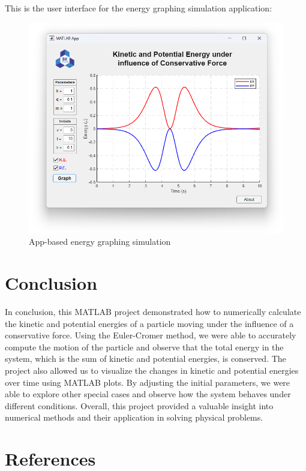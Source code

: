 \documentclass[13pt,a4paper]{report}
\begin{document}
\vspace{0.25cm}

This is the user interface for the energy graphing simulation application:

\vspace{-0.25cm}
\begin{figure}[!ht]
  \centering
  \includegraphics[scale=0.6]{result.png}
  \vspace{-0.75cm}
  \caption{App-based energy graphing simulation}
  \label{fig:result}
\end{figure}

\section{Conclusion}
In conclusion, this MATLAB project demonstrated how to numerically calculate the kinetic and potential energies of a particle moving under the influence of a conservative force. Using the Euler-Cromer method, we were able to accurately compute the motion of the particle and observe that the total energy in the system, which is the sum of kinetic and potential energies, is conserved. The project also allowed us to visualize the changes in kinetic and potential energies over time using MATLAB plots. By adjusting the initial parameters, we were able to explore other special cases and observe how the system behaves under different conditions. Overall, this project provided a valuable insight into numerical methods and their application in solving physical problems.

\newpage
\section{References}
\vspace{0.25cm}
\begin{itemize}[leftmargin=-0.655cm, label=]
    \nocite{*}%
    \printbibliography[heading=none]
\end{itemize}
\end{document}
